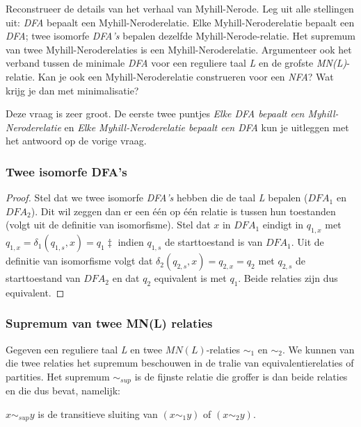 \begin{question}
  Reconstrueer de details van het verhaal van Myhill-Nerode. Leg uit alle stellingen uit: \emph{DFA} bepaalt een Myhill-Neroderelatie. Elke Myhill-Neroderelatie bepaalt een \emph{DFA}; twee isomorfe \emph{DFA's} bepalen dezelfde Myhill-Nerode-relatie. Het supremum van twee Myhill-Neroderelaties is een Myhill-Neroderelatie. Argumenteer ook het verband tussen de minimale \emph{DFA} voor een reguliere taal \emph{L} en de grofste \emph{MN(L)}-relatie.
  Kan je ook een Myhill-Neroderelatie construeren voor een \emph{NFA}? Wat krijg je dan met minimalisatie?
\end{question}

Deze vraag is zeer groot. De eerste twee puntjes \emph{Elke DFA bepaalt een Myhill-Neroderelatie} en \emph{Elke Myhill-Neroderelatie bepaalt een DFA} kun je uitleggen met het antwoord op de vorige vraag.

\subsubsection*{Twee isomorfe DFA's}

\begin{proof}
  Stel dat we twee isomorfe \emph{DFA's} hebben die de taal \emph{L} bepalen ($DFA_1$ en $DFA_2$). Dit wil zeggen dan er een \'e\'en op \'e\'en relatie is tussen hun toestanden (volgt uit de definitie van isomorfisme). Stel dat $x$ in $DFA_1$ eindigt in $q_{1,x}$ met $q_{1,x} = \delta_1(q_{1,s},x) = q_1‡$ indien $q_{1,s}$ de starttoestand is van $DFA_1$. Uit de definitie van isomorfisme volgt dat $\delta_2(q_{2,s},x) = q_{2,x} = q_2$ met $q_{2,s}$ de starttoestand van $DFA_2$ en dat $q_2$ equivalent is met $q_1$. Beide relaties zijn dus equivalent.
\end{proof}

\subsubsection*{Supremum van twee MN(L) relaties}

Gegeven een reguliere taal \emph{L} en twee $MN(L)$-relaties $\sim_1$ en $\sim_2$. We kunnen van die twee relaties het supremum beschouwen in de tralie van equivalentierelaties of partities. Het supremum $\sim_{sup}$ is de fijnste relatie die groffer is dan beide relaties en die dus bevat, namelijk:

\begin{theorem}
  $x \sim_{sup} y$ is de transitieve sluiting van $(x \sim_1 y)$ of $(x \sim_2 y)$.
\end{theorem}


